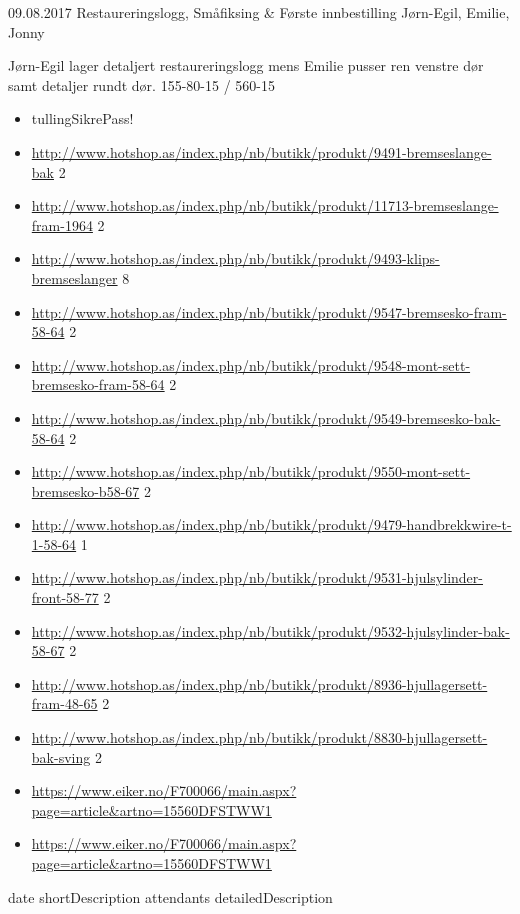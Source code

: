 \worklogitem
	{09.08.2017}
	{Restaureringslogg, Småfiksing \& Første innbestilling}
	{J\o rn-Egil, Emilie, Jonny}
	{J\o rn-Egil lager detaljert restaureringslogg mens Emilie pusser ren venstre d\o r samt detaljer rundt d\o r. 155-80-15 / 560-15
	\begin{itemize}

		\item tullingSikrePass!
		\item \url{http://www.hotshop.as/index.php/nb/butikk/produkt/9491-bremseslange-bak} 2
		\item \url{http://www.hotshop.as/index.php/nb/butikk/produkt/11713-bremseslange-fram-1964} 2
		\item \url{http://www.hotshop.as/index.php/nb/butikk/produkt/9493-klips-bremseslanger} 8
		\item \url{http://www.hotshop.as/index.php/nb/butikk/produkt/9547-bremsesko-fram-58-64} 2
		\item \url{http://www.hotshop.as/index.php/nb/butikk/produkt/9548-mont-sett-bremsesko-fram-58-64} 2
		\item \url{http://www.hotshop.as/index.php/nb/butikk/produkt/9549-bremsesko-bak-58-64} 2
		\item \url{http://www.hotshop.as/index.php/nb/butikk/produkt/9550-mont-sett-bremsesko-b58-67} 2
		\item \url{http://www.hotshop.as/index.php/nb/butikk/produkt/9479-handbrekkwire-t-1-58-64} 1
		\item \url{http://www.hotshop.as/index.php/nb/butikk/produkt/9531-hjulsylinder-front-58-77} 2
		\item \url{http://www.hotshop.as/index.php/nb/butikk/produkt/9532-hjulsylinder-bak-58-67} 2
		\item \url{http://www.hotshop.as/index.php/nb/butikk/produkt/8936-hjullagersett-fram-48-65} 2
		\item \url{http://www.hotshop.as/index.php/nb/butikk/produkt/8830-hjullagersett-bak-sving} 2

		\item \url{https://www.eiker.no/F700066/main.aspx?page=article&artno=15560DFSTWW1}
		\item \url{https://www.eiker.no/F700066/main.aspx?page=article&artno=15560DFSTWW1}
	\end{itemize}
	}



\worklogitem
	{date}
	{shortDescription}
	{attendants}
	{detailedDescription}
